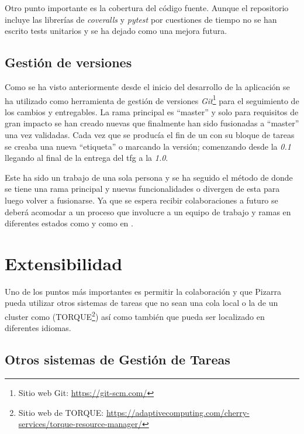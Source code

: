 \documentclass[11pt,spanish,listoffigures,listoftables]{tfgetsinf}
\begin{document}
Otro punto importante es la cobertura del código fuente. Aunque el repositorio incluye las librerías de \textit{coveralls} y \textit{pytest} por cuestiones de tiempo no se han escrito tests unitarios y se ha dejado como una mejora futura.

\section{Gestión de versiones}

Como se ha visto anteriormente desde el inicio del desarrollo de la aplicación se ha utilizado como herramienta de gestión de versiones \textit{Git}\footnote{Sitio web Git: \url{https://git-scm.com/}} para el seguimiento de los cambios y entregables. La rama principal es ``master'' y solo para requisitos de gran impacto se han creado nuevas que finalmente han sido fusionadas a ``master'' una vez validadas. Cada vez que se producía el fin de un  con su bloque de tareas se creaba una nueva ``etiqueta'' o  marcando la versión; comenzando desde la \textit{0.1} llegando al final de la entrega del \acrshort{tfg} a la \textit{1.0}.

Este ha sido un trabajo de una sola persona y se ha seguido el método de  \cite{link-git-flow} donde se tiene una rama principal y nuevas funcionalidades o  divergen de esta para luego volver a fusionarse. Ya que se espera recibir colaboraciones a futuro se deberá acomodar a un proceso que involucre a un equipo de trabajo y ramas en diferentes estados como  y  como en .

\chapter{Extensibilidad}

Uno de los puntos más importantes es permitir la colaboración y que Pizarra pueda utilizar otros sistemas de tareas que no sean una \Gls{cola} local o la de un cluster como \kahan(TORQUE\footnote{Sitio web de TORQUE: \url{https://adaptivecomputing.com/cherry-services/torque-resource-manager/}}) así como también que pueda ser localizado en diferentes idiomas.

\section{Otros sistemas de Gestión de Tareas}
\end{document}
